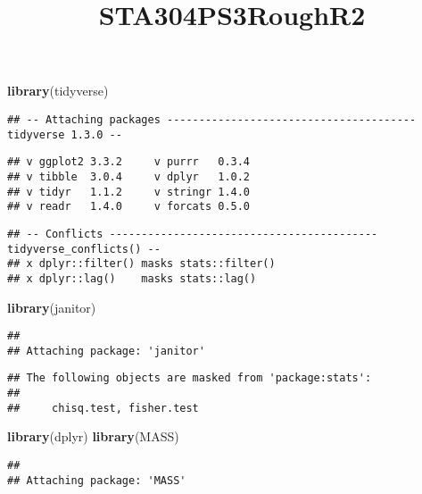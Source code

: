 \documentclass[
]{article}
\title{STA304PS3RoughR2}
\author{}
\date{\vspace{-2.5em}}
\newenvironment{Shaded}{\begin{snugshade}}{\end{snugshade}}
\newcommand{\KeywordTok}[1]{\textcolor[rgb]{0.13,0.29,0.53}{\textbf{#1}}}
\newcommand{\NormalTok}[1]{#1}
\begin{document}
\maketitle

\begin{Shaded}
\begin{Highlighting}[]
\KeywordTok{library}\NormalTok{(tidyverse)}
\end{Highlighting}
\end{Shaded}

\begin{verbatim}
## -- Attaching packages --------------------------------------- tidyverse 1.3.0 --
\end{verbatim}

\begin{verbatim}
## v ggplot2 3.3.2     v purrr   0.3.4
## v tibble  3.0.4     v dplyr   1.0.2
## v tidyr   1.1.2     v stringr 1.4.0
## v readr   1.4.0     v forcats 0.5.0
\end{verbatim}

\begin{verbatim}
## -- Conflicts ------------------------------------------ tidyverse_conflicts() --
## x dplyr::filter() masks stats::filter()
## x dplyr::lag()    masks stats::lag()
\end{verbatim}

\begin{Shaded}
\begin{Highlighting}[]
\KeywordTok{library}\NormalTok{(janitor)}
\end{Highlighting}
\end{Shaded}

\begin{verbatim}
## 
## Attaching package: 'janitor'
\end{verbatim}

\begin{verbatim}
## The following objects are masked from 'package:stats':
## 
##     chisq.test, fisher.test
\end{verbatim}

\begin{Shaded}
\begin{Highlighting}[]
\KeywordTok{library}\NormalTok{(dplyr)}
\KeywordTok{library}\NormalTok{(MASS)}
\end{Highlighting}
\end{Shaded}

\begin{verbatim}
## 
## Attaching package: 'MASS'
\end{verbatim}
\end{document}
